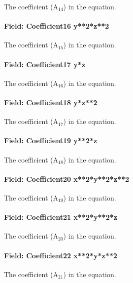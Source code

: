 The coefficient (A\(_{14}\)) in the equation.

\paragraph{Field: Coefficient16 y**2*z**2}\label{field-coefficient16-y2z2}

The coefficient (A\(_{15}\)) in the equation.

\paragraph{Field: Coefficient17 y*z}\label{field-coefficient17-yz}

The coefficient (A\(_{16}\)) in the equation.

\paragraph{Field: Coefficient18 y*z**2}\label{field-coefficient18-yz2}

The coefficient (A\(_{17}\)) in the equation.

\paragraph{Field: Coefficient19 y**2*z}\label{field-coefficient19-y2z}

The coefficient (A\(_{18}\)) in the equation.

\paragraph{Field: Coefficient20 x**2*y**2*z**2}\label{field-coefficient20-x2y2z2}

The coefficient (A\(_{19}\)) in the equation.

\paragraph{Field: Coefficient21 x**2*y**2*z}\label{field-coefficient21-x2y2z}

The coefficient (A\(_{20}\)) in the equation.

\paragraph{Field: Coefficient22 x**2*y*z**2}\label{field-coefficient22-x2yz2}

The coefficient (A\(_{21}\)) in the equation.


